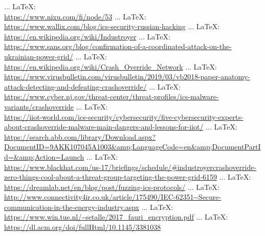 \begin{thebibliography}{99}
{{{{				
				
				
				 ... \LaTeX:\\ \url{https://www.nixu.com/fi/node/53}
				 ... \LaTeX:\\ \url{ https://www.wallix.com/blog/ics-security-russian-hacking}
				 ... \LaTeX:\\ \url{ https://en.wikipedia.org/wiki/Industroyer}
				 ... \LaTeX:\\ \url{https://www.sans.org/blog/confirmation-of-a-coordinated-attack-on-the-ukrainian-power-grid/}
				 ... \LaTeX:\\ \url{https://en.wikipedia.org/wiki/Crash_Override_Network}
				 ... \LaTeX:\\ \url{ https://www.virusbulletin.com/virusbulletin/2019/03/vb2018-paper-anatomy-attack-detecting-and-defeating-crashoverride/}
				 ... \LaTeX:\\ \url{ https://www.cyber.nj.gov/threat-center/threat-profiles/ics-malware-variants/crashoverride}
				 ... \LaTeX:\\ \url{https://iiot-world.com/ics-security/cybersecurity/five-cybersecurity-experts-about-crashoverride-malware-main-dangers-and-lessons-for-iiot/}
				 ... \LaTeX:\\ \url{ https://search.abb.com/library/Download.aspx?DocumentID=9AKK107045A1003&amp;LanguageCode=en&amp;DocumentPartId=&amp;Action=Launch}
				 ... \LaTeX:\\ \url{ https://www.blackhat.com/us-17/briefings/schedule/#industroyercrashoverride-zero-things-cool-about-a-threat-group-targeting-the-power-grid-6159}
				 ... \LaTeX:\\ \url{https://dreamlab.net/en/blog/post/fuzzing-ics-protocols/}
				 ... \LaTeX:\\ \url{http://www.connectivity4ir.co.uk/article/175490/IEC-62351--Secure-communication-in-the-energy-industry.aspx}
				 ... \LaTeX:\\ \url{https://www.win.tue.nl/~setalle/2017_fauri_encryption.pdf}
				 ... \LaTeX:\\ \url{https://dl.acm.org/doi/fullHtml/10.1145/3381038}
}}}}
\end{thebibliography}
